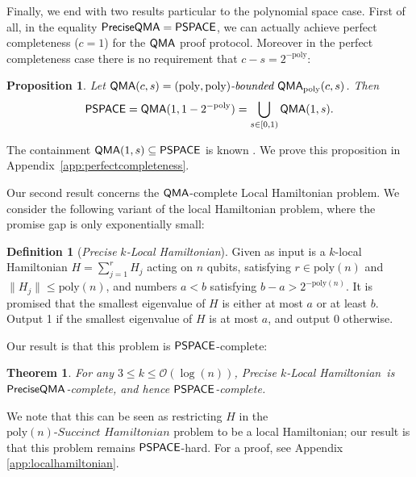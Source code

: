 \documentclass[11pt]{article}
\newtheorem{theorem}{Theorem}
\newtheorem{proposition}{Proposition}
\theoremstyle{definition}
\theoremstyle{remark}
\theoremstyle{definition}
\newtheorem{definition}{Definition}
\newcommand\QMA{{\sf{QMA}}}
\newcommand\PSPACE{{\sf{PSPACE}}}
\newcommand\QMAexp{{\sf{PreciseQMA}}}
\newcommand\bddQMA[5]{{\left(#1,#2\right)}\textit{-bounded }\QMA_{#3}(#4,#5)}
\newcommand\preciseklh{\textit{Precise }$k$\textit{-Local Hamiltonian}}
\newcommand\spechamiltonian[1]{#1\textit{-Succinct Hamiltonian}}
\newcommand{\poly}{\textrm{poly}}
\begin{document}
Finally, we end with two results particular to the polynomial space case. First of all, in the equality $\QMAexp=\PSPACE$, we can actually achieve perfect completeness ($c=1$) for the $\QMA$ proof protocol. Moreover in the perfect completeness case there is no requirement that $c-s = 2^{-\poly}$:
\begin{proposition} \label{prop: perfect completeness} Let $\QMA(c,s) = \bddQMA{\poly}{\poly}{\poly}{c}{s}$. Then
\[
\PSPACE = \QMA(1,1-2^{-\poly}) = \bigcup_{s \in [0,1)}\QMA(1,s).
\]
\end{proposition}
The containment $\QMA(1,s) \subseteq \PSPACE$ is known \cite{ikw12}. We prove this proposition in Appendix~\ref{app:perfectcompleteness}.

Our second result concerns the $\QMA$-complete Local Hamiltonian problem. We consider the following variant of the local Hamiltonian problem, where the promise gap is only exponentially small: 
\begin{definition}[\preciseklh]
Given as input is a $k$-local Hamiltonian $H=\sum_{j=1}^rH_j$ acting on $n$ qubits, satisfying $r \in \poly(n)$ and $\|H_j\| \le \poly(n)$, and numbers $a < b$ satisfying $b - a > 2^{-\poly(n)}$. It is promised that the smallest eigenvalue of $H$ is either at most $a$ or at least $b$. Output 1 if the smallest eigenvalue of $H$ is at most $a$, and output 0 otherwise.
\end{definition}
Our result is that this problem is $\PSPACE$-complete:
\begin{theorem} \label{thm: precise local hamiltonian}
For any $3 \le k \le \mathcal{O}(\log(n))$, \preciseklh \ is $\QMAexp$-complete, and hence $\PSPACE$-complete.
\end{theorem}
We note that this can be seen as restricting $H$ in the $\spechamiltonian{\poly(n)}$ problem to be a local Hamiltonian; our result is that this problem remains $\PSPACE$-hard. For a proof, see Appendix \ref{app:localhamiltonian}.
\end{document}
